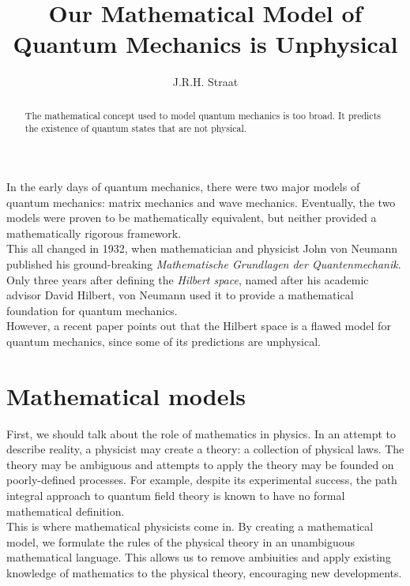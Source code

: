 \documentclass[12pt]{article}
\title{Our Mathematical Model of Quantum Mechanics is Unphysical}      %
\author{J.R.H. Straat}
\date{}
\begin{document}
\maketitle
%
\begin{abstract}
	The mathematical concept used to model quantum mechanics is too broad. It predicts the existence of quantum states that are not physical.
\end{abstract}
%
\begin{multicols}{2}
    In the early days of quantum mechanics, there were two major models of quantum mechanics: matrix mechanics and wave mechanics. Eventually, the two models were proven to be mathematically equivalent, but neither provided a mathematically rigorous framework.\\
    This all changed in 1932, when mathematician and physicist John von Neumann published his ground-breaking \textit{Mathematische Grundlagen der Quantenmechanik}\cite{von_neumann_mathematische_1996}. Only three years after defining the \textit{Hilbert space}, named after his academic advisor David Hilbert, von Neumann used it to provide a mathematical foundation for quantum mechanics.\\
    However, a recent paper\cite{carcassi_unphysicality_2023} points out that the Hilbert space is a flawed model for quantum mechanics, since some of its predictions are unphysical.
    \section*{Mathematical models}
    First, we should talk about the role of mathematics in physics. In an attempt to describe reality, a physicist may create a theory: a collection of physical laws. The theory may be ambiguous and attempts to apply the theory may be founded on poorly-defined processes. For example, despite its experimental success, the path integral approach to quantum field theory is known to have no formal mathematical definition.\\
    This is where mathematical physicists come in. By creating a mathematical model, we formulate the rules of the physical theory in an unambiguous mathematical language. This allows us to remove ambiuities and apply existing knowledge of mathematics to the physical theory, encouraging new developments.

\end{multicols}
\end{document}
